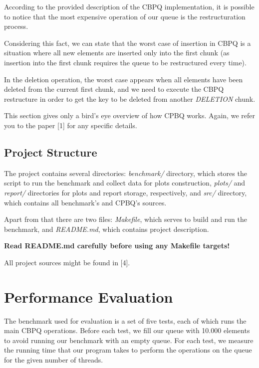 \documentclass{article}
\begin{document}
According to the provided description of the CBPQ implementation, it is possible to notice that the most expensive operation of our queue is the restructuration process.\par

Considering this fact, we can state that the worst case of insertion in CBPQ is a situation where all new elements are inserted only into the first chunk (as insertion into the first chunk requires the queue to be restructured every time).\par

In the deletion operation, the worst case appears when all elements have been deleted from the current first chunk, and we need to execute the CBPQ restructure in order to get the key to be deleted from another \emph{DELETION} chunk.\newline\par

This section gives only a bird's eye overview of how CPBQ works. Again, we refer you to the paper [1] for any specific details.

\subsection{Project Structure}

The project contains several directories: \textit{benchmark/} directory, which stores the script to run the benchmark and collect data for plots construction, \textit{plots/} and \textit{report/} directories for plots and report storage, respectively, and \textit{src/} directory, which contains all benchmark's and CPBQ's sources.\par

Apart from that there are two files: \textit{Makefile}, which serves to build and run the benchmark, and \textit{README.md}, which contains project description.\par

\textbf{Read README.md carefully before using any Makefile targets!}\par
All project sources might be found in [4].

\section{Performance Evaluation}
The benchmark used for evaluation is a set of five tests, each of which runs the main CBPQ operations. Before each test, we fill our queue with 10.000 elements to avoid running our benchmark with an empty queue. For each test, we measure the running time that our program takes to perform the operations on the queue for the given number of threads.\par
\end{document}
